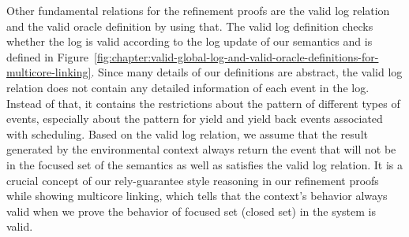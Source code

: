 Other fundamental relations for the refinement proofs are the valid log relation and the valid oracle definition by using that.
The valid log definition checks whether the log is valid according to the log update of our semantics and
is defined in Figure~\ref{fig:chapter:valid-global-log-and-valid-oracle-definitions-for-multicore-linking}.
Since many details of our definitions are abstract, the valid log relation does not contain any detailed information 
of each event in the log.
Instead of that, it contains the restrictions about the pattern of different types of events, especially about the pattern for yield and  yield back events associated with scheduling.
Based on the valid log relation, 
we assume that the result generated by the environmental context always return the event that 
will not be in the focused set of the semantics as well as satisfies the valid log relation.
It is a crucial concept of our rely-guarantee style reasoning in our refinement proofs while showing multicore linking, which tells that the context's behavior always valid when we prove the behavior of focused set (closed set) in the system is valid. 


